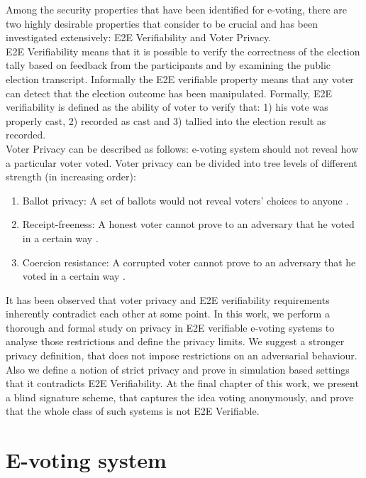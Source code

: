 \documentclass[12pt]{article}
\begin{document}
Among the security properties that have been identified for e-voting, there are two highly desirable properties that consider to be crucial and has been investigated extensively: E2E Verifiability and Voter Privacy.\\

 E2E Verifiability means that it is possible to verify the correctness of the election tally based on feedback from the participants and by examining the public election transcript. Informally the E2E verifiable property means that any voter can detect that the election outcome has been manipulated.  Formally, E2E verifiability is defined as the ability of voter  to verify that: 1) his vote was properly cast, 2) recorded as cast and 3) tallied into the election result as recorded. \\
 
 Voter Privacy can be described as follows: e-voting system should not reveal how a particular voter voted. Voter privacy can be divided into tree levels of different strength (in increasing order):
\begin{enumerate}
\item Ballot privacy: A set of ballots would not reveal  voters' choices to anyone \cite{Bernhard2015}. 
\item Receipt-freeness: A honest voter cannot prove to an adversary that he voted in a certain way \cite{Kremer}.
\item Coercion resistance: A corrupted voter cannot prove to an adversary that he voted in a certain way \cite{Delaune2006}.
\end{enumerate}

It has been observed that voter privacy and E2E verifiability requirements inherently contradict each other at some point. In this work, we perform a thorough and formal study on privacy in E2E verifiable e-voting systems to analyse those restrictions and define the privacy limits. We suggest a stronger privacy definition, that does not impose restrictions on an adversarial behaviour. Also we define a notion of strict privacy and prove in simulation based settings that it contradicts E2E Verifiability. At the final chapter of this work, we present a blind signature scheme, that captures the idea voting anonymously, and prove that the whole class of such systems is not E2E Verifiable.  

\section{E-voting system} 
\end{document}
